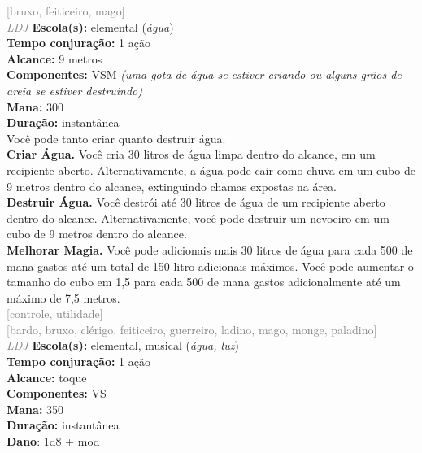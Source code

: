 \documentclass{RPG_Adventure}[2021/10/20]
\begin{document}
{\scriptsize \textcolor{gray}{[bruxo, feiticeiro, mago]\\}}
{\tiny \textcolor{gray}{\textit{LDJ}}}
{\small \t \textbf{Escola(s):} elemental (\textit{água})\\\t \textbf{Tempo conjuração:} 1 ação\\\t \textbf{Alcance:} 9 metros\\\t \textbf{Componentes:} VSM \textit{(uma gota de água se estiver criando ou alguns grãos de areia se estiver destruindo)}\\\t \textbf{Mana:} 300\\\t \textbf{Duração:} instantânea\\}
{\normalsize Você pode tanto criar quanto destruir água.\\\t \textbf{Criar Água.} Você cria 30 litros de água limpa dentro do alcance, em um recipiente aberto. Alternativamente, a água pode cair como chuva em um cubo de 9 metros dentro do alcance, extinguindo chamas expostas na área.\\\t \textbf{Destruir Água.} Você destrói até 30 litros de água de um recipiente aberto dentro do alcance. Alternativamente, você pode destruir um nevoeiro em um cubo de 9 metros dentro do alcance.\\\t \textbf{Melhorar Magia.} Você pode adicionais mais 30 litros de água para cada 500 de mana gastos até um total de 150 litro adicionais máximos. Você pode aumentar o tamanho do cubo em 1,5 para cada 500 de mana gastos adicionalmente até um máximo de 7,5 metros.\\}
{\scriptsize \textcolor{gray}{[controle, utilidade]\\}}
{\scriptsize \textcolor{gray}{[bardo, bruxo, clérigo, feiticeiro, guerreiro, ladino, mago, monge, paladino]\\}}
{\tiny \textcolor{gray}{\textit{LDJ}}}
{\small \t \textbf{Escola(s):} elemental, musical (\textit{água, luz})\\\t \textbf{Tempo conjuração:} 1 ação\\\t \textbf{Alcance:} toque\\\t \textbf{Componentes:} VS\\\t \textbf{Mana:} 350\\\t \textbf{Duração:} instantânea\\\t \textbf{Dano}: 1d8 + mod\\}
\end{document}
